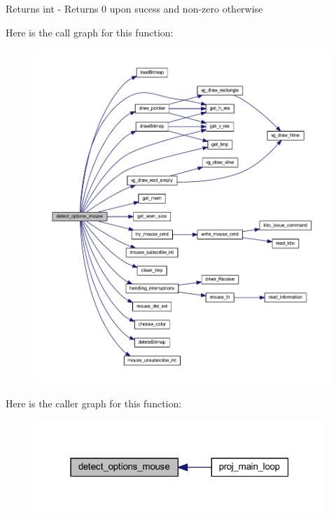 \begin{DoxyReturn}{Returns}
int -\/ Returns 0 upon sucess and non-\/zero otherwise 
\end{DoxyReturn}
Here is the call graph for this function\+:
\nopagebreak
\begin{figure}[H]
\begin{center}
\leavevmode
\includegraphics[width=350pt]{group__main__menu_gadf0b351e14ba0cb60a8d69e8b4423e68_cgraph}
\end{center}
\end{figure}
Here is the caller graph for this function\+:
\nopagebreak
\begin{figure}[H]
\begin{center}
\leavevmode
\includegraphics[width=313pt]{group__main__menu_gadf0b351e14ba0cb60a8d69e8b4423e68_icgraph}
\end{center}
\end{figure}
\mbox{\label{group__main__menu_ga583b8136014872071b0373049b6fde3c}} 
